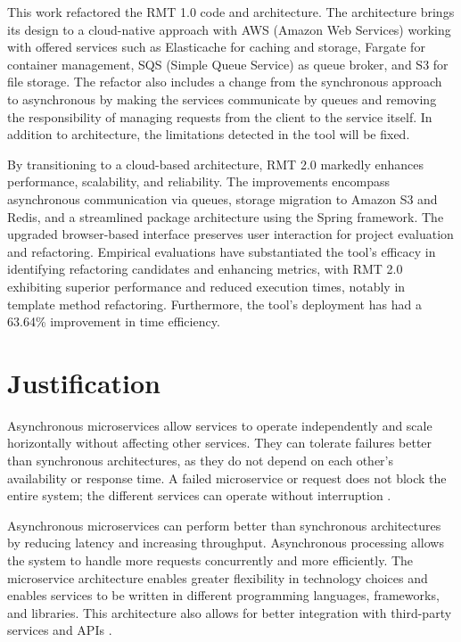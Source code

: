 This work refactored the RMT 1.0 code and architecture. The architecture brings its design to a cloud-native approach with AWS (Amazon Web Services) working with offered services such as Elasticache for caching and storage, Fargate for container management, SQS (Simple Queue Service) as queue broker, and S3 for file storage. The refactor also includes a change from the synchronous approach to asynchronous by making the services communicate by queues and removing the responsibility of managing requests from the client to the service itself. In addition to architecture, the limitations detected in the tool will be fixed.

By transitioning to a cloud-based architecture, RMT 2.0 markedly enhances performance, scalability, and reliability. The improvements encompass asynchronous communication via queues, storage migration to Amazon S3 and Redis, and a streamlined package architecture using the Spring framework. The upgraded browser-based interface preserves user interaction for project evaluation and refactoring. Empirical evaluations have substantiated the tool's efficacy in identifying refactoring candidates and enhancing metrics, with RMT 2.0 exhibiting superior performance and reduced execution times, notably in template method refactoring. Furthermore, the tool's deployment has had a 63.64\% improvement in time efficiency.


\section{Justification}
Asynchronous microservices allow services to operate independently and scale horizontally without affecting other services. They can tolerate failures better than synchronous architectures, as they do not depend on each other's availability or response time. A failed microservice or request does not block the entire system; the different services can operate without interruption \cite{microservices-comuni}.

Asynchronous microservices can perform better than synchronous architectures by reducing latency and increasing throughput. Asynchronous processing allows the system to handle more requests concurrently and more efficiently. The microservice architecture enables greater flexibility in technology choices and enables services to be written in different programming languages, frameworks, and libraries. This architecture also allows for better integration with third-party services and APIs \cite{larrucea2018}.

